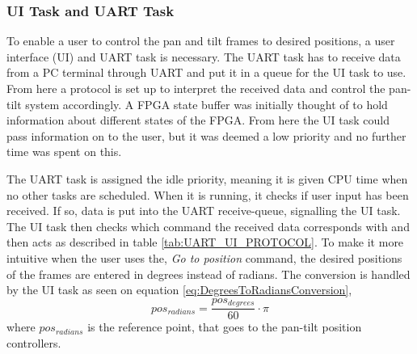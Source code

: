 \documentclass[../../main.tex]{subfiles}
\begin{document}





\subsubsection*{UI Task and UART Task}

To enable a user to control the pan and tilt frames to desired positions, a user interface (UI) and UART task is necessary. The UART task has to receive data from a PC terminal through UART and put it in a queue for the UI task to use. From here a protocol is set up to interpret the received data and control the pan-tilt system accordingly. A FPGA state buffer was initially thought of to hold information about different states of the FPGA. From here the UI task could pass information on to the user, but it was deemed a low priority and no further time was spent on this.

The UART task is assigned the idle priority, meaning it is given CPU time when no other tasks are scheduled. When it is running, it checks if user input has been received. If so, data is put into the UART receive-queue, signalling the UI task. The UI task then checks which command the received data corresponds with and then acts as described in table \ref{tab:UART_UI_PROTOCOL}. To make it more intuitive when the user uses the, \textit{Go to position} command, the desired positions of the frames are entered in degrees instead of radians. The conversion is handled by the UI task as seen on equation \ref{eq:DegreesToRadiansConversion},
\begin{equation} \label{eq:DegreesToRadiansConversion}
    pos_{radians} = \frac{pos_{degrees}}{60}\cdot \pi
\end{equation}
where $pos_{radians}$ is the reference point, that goes to the pan-tilt position controllers.
\end{document}
